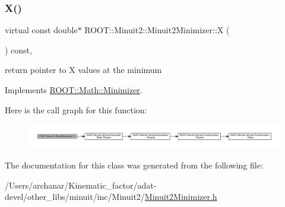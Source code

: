 \subsubsection{\texorpdfstring{X()}{X()}\hspace{0.1cm}{\footnotesize\ttfamily [3/3]}}
{\footnotesize\ttfamily virtual const double$\ast$ R\+O\+O\+T\+::\+Minuit2\+::\+Minuit2\+Minimizer\+::X (\begin{DoxyParamCaption}{ }\end{DoxyParamCaption}) const\hspace{0.3cm}{\ttfamily [inline]}, {\ttfamily [virtual]}}



return pointer to X values at the minimum 



Implements \mbox{\hyperlink{classROOT_1_1Math_1_1Minimizer_a35c7c2caf54e548f892d84795209edad}{R\+O\+O\+T\+::\+Math\+::\+Minimizer}}.

Here is the call graph for this function\+:
\nopagebreak
\begin{figure}[H]
\begin{center}
\leavevmode
\includegraphics[width=350pt]{d0/d9c/classROOT_1_1Minuit2_1_1Minuit2Minimizer_ac9372eb08937cf14acb8862ba3166c26_cgraph}
\end{center}
\end{figure}


The documentation for this class was generated from the following file\+:\begin{DoxyCompactItemize}
\item 
/\+Users/archanar/\+Kinematic\+\_\+factor/adat-\/devel/other\+\_\+libs/minuit/inc/\+Minuit2/\mbox{\hyperlink{adat-devel_2other__libs_2minuit_2inc_2Minuit2_2Minuit2Minimizer_8h}{Minuit2\+Minimizer.\+h}}\end{DoxyCompactItemize}
